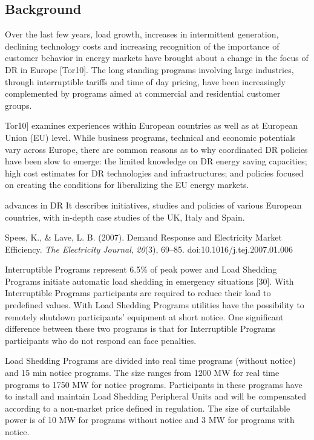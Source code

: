 
\subsection{Background}

Over the last few years, load growth, increases in intermittent generation,
declining technology costs and increasing recognition of the importance of
customer behavior in energy markets have brought about a change in the
focus of DR in Europe [Tor10]. The long standing programs involving large
industries, through interruptible tariffs and time of day pricing, have been
increasingly complemented by programs aimed at commercial and residential
customer groups.

\cite{torriti_demand_2010} Tor10] examines experiences within European countries as well as at
European Union (EU) level. While business programs, technical and economic
potentials vary across Europe, there are common reasons as to why
coordinated DR policies have been slow to emerge: the limited knowledge on
DR energy saving capacities; high cost estimates for DR technologies and
infrastructures; and policies focused on creating the conditions for
liberalizing the EU energy markets.


advances in DR It describes initiatives, studies and policies of various
European countries, with in-depth case studies of the UK, Italy and Spain.

Spees, K., {\&} Lave, L. B. (2007). Demand Response and Electricity Market
Efficiency. \textit{The Electricity Journal}, \textit{20}(3), 69--85. doi:10.1016/j.tej.2007.01.006

Interruptible Programs represent 6.5{\%} of peak power and Load Shedding
Programs initiate automatic load shedding in emergency situations [30].
With Interruptible Programs participants are required to reduce their load
to predefined values. With Load Shedding Programs utilities have the
possibility to remotely shutdown participants' equipment at short notice.
One significant difference between these two programs is that for
Interruptible Programs participants who do not respond can face penalties.


Load Shedding Programs are divided into real time programs (without
notice) and 15 min notice programs. The size ranges from 1200 MW for real
time programs to 1750 MW for notice programs. Participants in these
programs have to install and maintain Load Shedding Peripheral Units and
will be compensated according to a non-market price defined in regulation.
The size of curtailable power is of 10 MW for programs without notice and
3 MW for programs with notice.

